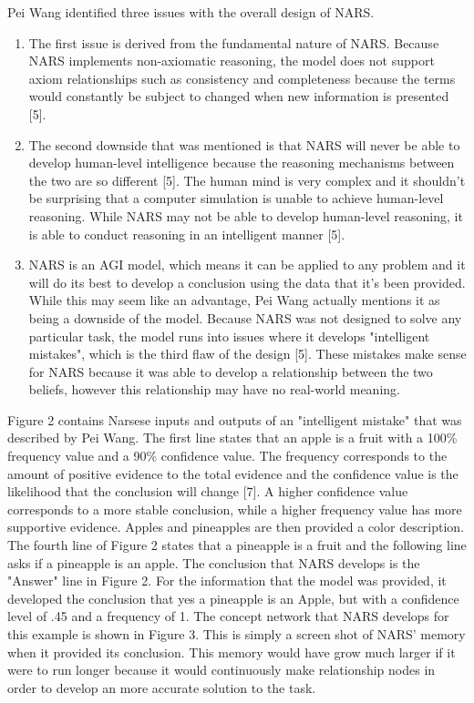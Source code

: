 \documentclass[conference]{IEEEtran}
\begin{document}
	Pei Wang identified three issues with the overall design of NARS.   	 
	 
\begin{enumerate}
  \item The first issue is derived from the fundamental nature of NARS. Because NARS implements non-axiomatic reasoning, the model does not support axiom relationships such as consistency and completeness because the terms would constantly be subject to changed when new information is presented [5].
  \item The second downside that was mentioned is that NARS will never be able to develop human-level intelligence because the reasoning mechanisms between the two are so different [5]. The human mind is very complex and it shouldn't be surprising that a computer simulation is unable to achieve human-level reasoning. While NARS may not be able to develop human-level reasoning, it is able to conduct reasoning in an intelligent manner [5].
  \item  NARS is an AGI model, which means it can be applied to any problem and it will do its best to develop a conclusion using the data that it's been provided. While this may seem like an advantage, Pei Wang actually mentions it as being a downside of the model. Because NARS was not designed to solve any particular task, the model runs into issues where it develops "intelligent mistakes", which is the third flaw of the design [5]. These mistakes make sense for NARS because it was able to develop a relationship between the two beliefs, however this relationship may have no real-world meaning.
\end{enumerate}	 
	 
	 Figure 2 contains Narsese inputs and outputs of an "intelligent mistake" that was described by Pei Wang. The first line states that an apple is a fruit with a 100\% frequency value and a 90\% confidence value. The frequency corresponds to the amount of positive evidence to the total evidence and the confidence value is the likelihood that the conclusion will change [7]. A higher confidence value corresponds to a more stable conclusion, while a higher frequency value has more supportive evidence. Apples and pineapples are then provided a color description. The fourth line of Figure 2 states that a pineapple is a fruit and the following line asks if a pineapple is an apple. The conclusion that NARS develops is the "Answer" line in Figure 2. For the information that the model was provided, it developed the conclusion that yes a pineapple is an Apple, but with a confidence level of .45 and a frequency of 1. The concept network that NARS develops for this example is shown in Figure 3. This is simply a screen shot of NARS' memory when it provided its conclusion. This memory would have grow much larger if it were to run longer because it would continuously make relationship nodes in order to develop an more accurate solution to the task.
	 
\end{document}
